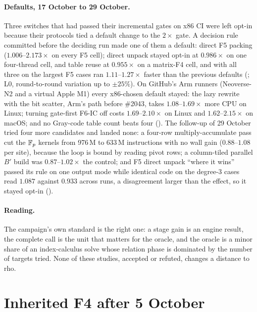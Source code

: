 \paragraph{Defaults, 17 October to 29 October.} Three switches that had
passed their incremental gates on x86 CI were left opt-in because their
protocols tied a default change to the $2\times$ gate. A decision rule
committed before the deciding run made one of them a default: direct F5
packing ($1.006$--$2.173\times$ on every F5 cell); direct unpack stayed opt-in
at $0.986\times$ on one four-thread cell, and table reuse at $0.955\times$ on a
matrix-F4 cell, and with all three on the largest F5 cases ran
$1.11$--$1.27\times$ faster than the previous defaults
(; L0, round-to-round
variation up to $\pm25\%$). On GitHub's Arm runners (Neoverse-N2 and a
virtual Apple M1) every x86-chosen default stayed: the lazy rewrite with the
bit scatter, Arm's path before \#2043, takes $1.08$--$1.69\times$ more CPU on
Linux; turning gate-first F6-IC off costs $1.69$--$2.10\times$ on Linux and
$1.62$--$2.15\times$ on macOS; and no Gray-code table count beats four
(). The follow-up of 29
October tried four more candidates and landed none: a four-row
multiply-accumulate pass cut the $\mathbb{F}_p$ kernels from 976\,M to 633\,M
instructions with no wall gain ($0.88$--$1.08$ per site), because the loop is
bound by reading pivot rows; a column-tiled parallel $B'$ build was
$0.87$--$1.02\times$ the control; and F5 direct unpack ``where it wins''
passed its rule on one output mode while identical code on the degree-3
cases read $1.087$ against $0.933$ across runs, a disagreement larger than
the effect, so it stayed opt-in
().

\paragraph{Reading.} The campaign's own standard is the right one: a
stage gain is an engine result, the complete call is the unit that matters
for the oracle, and the oracle is a minor share of an index-calculus solve
whose relation phase is dominated by the number of targets tried. None of
these studies, accepted or refuted, changes a distance to rho.

\section{Inherited F4 after 5 October}\label{sec:bo-inherited}

